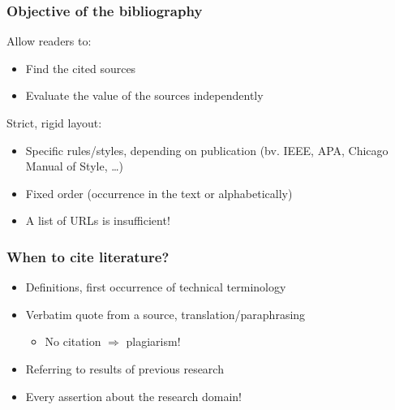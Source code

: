 \documentclass{beamer}
\begin{document}
\begin{frame}
  \frametitle{Objective of the bibliography}

  Allow readers to:

  \begin{itemize}
    \item Find the cited sources
    \item Evaluate the value of the sources independently
  \end{itemize}

  \pause

  Strict, rigid layout:

  \begin{itemize}
    \item Specific rules/styles, depending on publication (bv. IEEE, APA, Chicago Manual of Style, \ldots)
    \item Fixed order (occurrence in the text or alphabetically)
    \item A list of URLs is insufficient!
  \end{itemize}

  \pause

\end{frame}

\begin{frame}
  \frametitle{When to cite literature?}

  \begin{itemize}
    \item Definitions, first occurrence of technical terminology
    \item Verbatim quote from a source, translation/paraphrasing
      \begin{itemize}
        \item No citation $\Rightarrow$ \alert{plagiarism!}
      \end{itemize}
    \item Referring to results of previous research
    \item Every assertion about the research domain!
  \end{itemize}

  \vfill

\end{frame}
\end{document}

